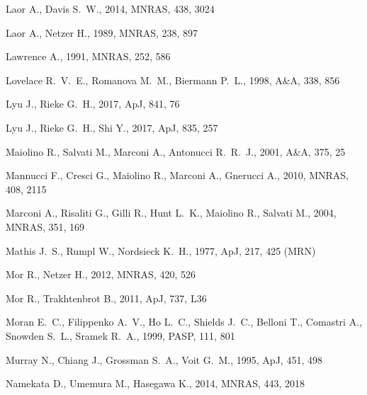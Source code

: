 \documentclass[a4paper,fleqn,usenatbib]{mnras}
\begin{document}
\begin{thebibliography}{99}
 Laor A., Davis S.~W., 2014, MNRAS, 438, 3024 

 Laor A., Netzer H., 1989, MNRAS, 238, 897 

 Lawrence A., 1991, MNRAS, 252, 586 

 Lovelace R.~V.~E., Romanova M.~M., Biermann P.~L., 1998, A\&A, 338, 856 

 Lyu J., Rieke G.~H., 2017, ApJ, 841, 76 

 Lyu J., Rieke G.~H., Shi Y., 2017, ApJ, 835, 257 

 Maiolino R., Salvati M., Marconi A., Antonucci R.~R.~J., 2001, A\&A, 375, 25 

 Mannucci F., Cresci G., Maiolino R., Marconi A., Gnerucci A., 2010, MNRAS, 408, 2115 

 Marconi A., Risaliti G., Gilli R., Hunt L.~K., Maiolino R., Salvati M., 2004, MNRAS, 351, 169 

 Mathis J.~S., Rumpl W., Nordsieck K.~H., 1977, ApJ, 217, 425 (MRN)

 Mor R., Netzer H., 2012, MNRAS, 420, 526 

 Mor R., Trakhtenbrot B., 2011, ApJ, 737, L36 

 Moran E.~C., Filippenko A.~V., Ho L.~C., Shields J.~C., Belloni T., Comastri A., Snowden S.~L., Sramek R.~A., 1999, PASP, 111, 801 

 Murray N., Chiang J., Grossman S.~A., Voit G.~M., 1995, ApJ, 451, 498 

 Namekata D., Umemura M., Hasegawa K., 2014, MNRAS, 443, 2018
 

\end{thebibliography}
\end{document}
